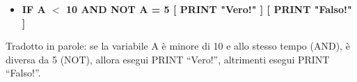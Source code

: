 \vskip 1cm

\begin{scriptsize}
\begin{minipage}{0.80\textwidth}
\begin{itemize}[itemsep=-3pt,parsep=2pt, leftmargin=-0.0mm ]
\item[]	\textbf{IF A $<$ 10 AND NOT A = 5 [ PRINT "Vero!" ] [ PRINT "Falso!" ]}                      
\end{itemize}
\end{minipage}
\end{scriptsize}

\vskip 1cm

Tradotto in parole: se la variabile A è minore di 10 e allo stesso tempo (AND), è diversa da 5 (NOT), allora esegui PRINT “Vero!”, altrimenti esegui PRINT “Falso!”.







